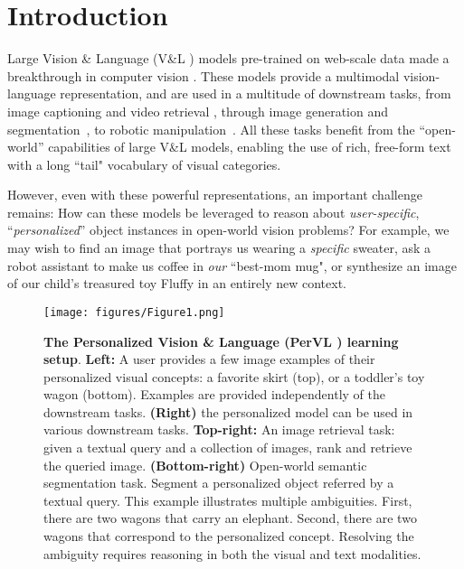 \documentclass[runningheads]{llncs}
\newcommand{\VL}{V\&L {}}
\newcommand{\PerVL}{PerVL {}}
\begin{document}
\section{Introduction}
Large  Vision \& Language (\VL\!\!) models pre-trained on web-scale data made a breakthrough in computer vision \cite{radford2021learning,yuan2021florence,bommasani2021opportunities}. These models  provide a multimodal vision-language representation, and are used in a multitude of downstream tasks, from image captioning \cite{mokady2021clipcap} and video retrieval \cite{fang2021clip2video}, through image generation \cite{gal2021stylegan,patashnik2021styleclip} and segmentation~\cite{zabari2021semantic,li2022languagedriven}, to robotic manipulation~\cite{shridhar2021cliport}. All these tasks benefit from the ``open-world'' capabilities of large V\&L models, enabling the use of rich, free-form text with a long ``tail" vocabulary of visual categories.


However, even with these powerful representations, an important challenge remains: How can these models be leveraged to reason about \textit{user-specific}, ``\textit{personalized}'' object instances in open-world vision problems? For example, we may wish to find an image that portrays us wearing a \textit{specific} sweater, ask a robot assistant to make us coffee in \textit{our} ``best-mom mug", or synthesize an image of our child's treasured toy Fluffy in an entirely new context.


\begin{figure}[t]
    \centering
    \texttt{[image: figures/Figure1.png]} \caption{
    \textbf{The Personalized Vision \& Language (\PerVL\!\!) learning setup}. \textbf{Left:} A user provides a few image examples of their personalized visual concepts: a favorite skirt (top), or a toddler's toy wagon (bottom). Examples are provided independently of the downstream tasks. \textbf{(Right)} the personalized model can be used in various downstream tasks. \textbf{Top-right:} An image retrieval task: given a textual query and a collection of images,
    rank and retrieve the queried image. \textbf{(Bottom-right)} Open-world semantic segmentation task. Segment a personalized object referred by a textual query. This example illustrates multiple ambiguities. First, there are two wagons that carry an elephant. Second, there are two wagons that correspond to the personalized concept. Resolving the ambiguity requires reasoning in both the visual and text modalities.
    }
    \label{fig1}
\end{figure}
\end{document}
